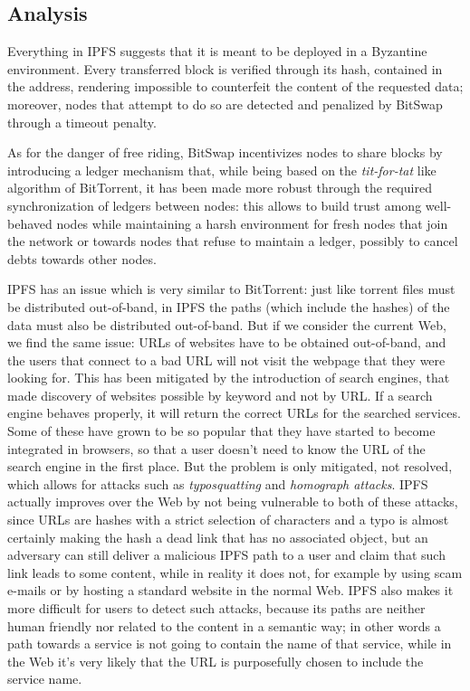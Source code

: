 \documentclass[mscthesis]{usiinfthesis}
\begin{document}
\subsection{Analysis}\label{sec:ipfsanalysis}

Everything in IPFS suggests that it is meant to be deployed in a Byzantine environment. Every transferred block is verified through its hash, contained in the address, rendering impossible to counterfeit the content of the requested data; moreover, nodes that attempt to do so are detected and penalized by BitSwap through a timeout penalty.

As for the danger of free riding, BitSwap incentivizes nodes to share blocks by introducing a ledger mechanism that, while being based on the \textit{tit-for-tat} like algorithm of BitTorrent, it has been made more robust through the required synchronization of ledgers between nodes: this allows to build trust among well-behaved nodes while maintaining a harsh environment for fresh nodes that join the network or towards nodes that refuse to maintain a ledger, possibly to cancel debts towards other nodes. %

IPFS has an issue which is very similar to BitTorrent: just like torrent files must be distributed out-of-band, in IPFS the paths (which include the hashes) of the data must also be distributed out-of-band. But if we consider the current Web, we find the same issue: URLs of websites have to be obtained out-of-band, and the users that connect to a bad URL will not visit the webpage that they were looking for. This has been mitigated by the introduction of search engines, that made discovery of websites possible by keyword and not by URL. If a search engine behaves properly, it will return the correct URLs for the searched services. Some of these have grown to be so popular that they have started to become integrated in browsers, so that a user doesn't need to know the URL of the search engine in the first place. But the problem is only mitigated, not resolved, which allows for attacks such as \textit{typosquatting} and \textit{homograph attacks}. %
IPFS actually improves over the Web by not being vulnerable to both of these attacks, since URLs are hashes with a strict selection of characters and a typo is almost certainly making the hash a dead link that has no associated object, but an adversary can still deliver a malicious IPFS path to a user and claim that such link leads to some content, while in reality it does not, for example by using scam e-mails or by hosting a standard website in the normal Web. IPFS also makes it more difficult for users to detect such attacks, because its paths are neither human friendly nor related to the content in a semantic way; in other words a path towards a service is not going to contain the name of that service, while in the Web it's very likely that the URL is purposefully chosen to include the service name. %
\end{document}
